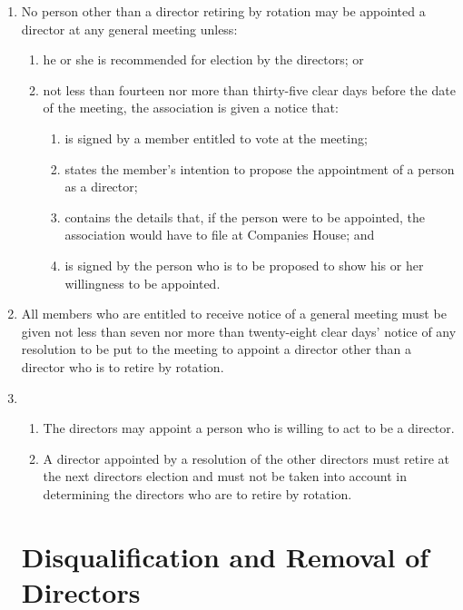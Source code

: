 \begin{enumerate}
\item
  No person other than a director retiring by rotation may be
  appointed a director at any general meeting unless:
  \begin{enumerate}
  \item
    he or she is recommended for election by the directors; or
  \item
    not less than fourteen nor more than thirty-five clear days before
    the date of the meeting, the association is given a notice that:
    \begin{enumerate}
    \item
      is signed by a member entitled to vote at the meeting;
    \item
      states the member's intention to propose the appointment of a
      person as a director;
    \item
      contains the details that, if the person were to be appointed, the
      association would have to file at Companies House; and
    \item
      is signed by the person who is to be proposed to show his or her
      willingness to be appointed.
    \end{enumerate}
  \end{enumerate}
\item
  All members who are entitled to receive notice of a general meeting
  must be given not less than seven nor more than twenty-eight clear
  days' notice of any resolution to be put to the meeting to appoint
  a director other than a director who is to retire by rotation.

\item
  \begin{enumerate}
  \item
    The directors may appoint a person who is willing to act to be a
    director.
  \item
    A director appointed by a resolution of the other directors must
    retire at the next directors election and must not be taken
    into account in determining the directors who are to retire by
    rotation.
  \end{enumerate}

\section{Disqualification and Removal of Directors}


\end{enumerate}
